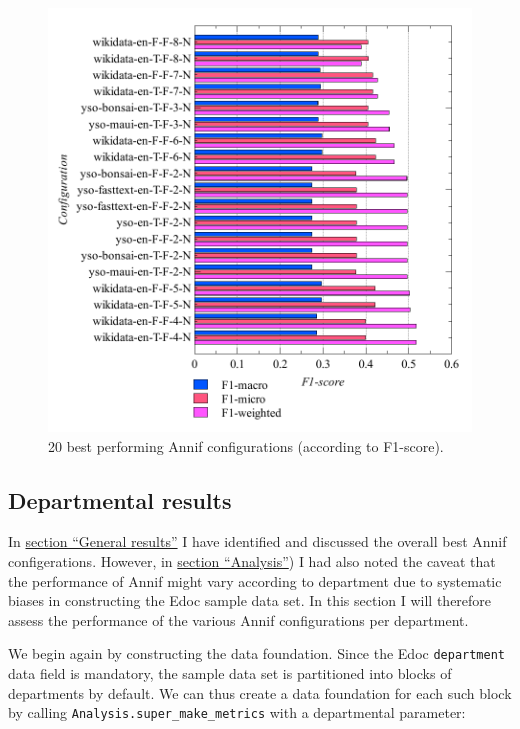 \begin{figure}
\centering
\includegraphics{images/metrics_f1_top20.pdf}
\caption{20 best performing Annif configurations (according to
F1-score).}
\end{figure}

\hypertarget{departmental-results}{%
\subsection{Departmental results}\label{departmental-results}}

In \protect\hyperlink{general-results}{section ``General results''} I
have identified and discussed the overall best Annif configerations.
However, in \protect\hyperlink{analysis}{section ``Analysis''}) I had
also noted the caveat that the performance of Annif might vary according
to department due to systematic biases in constructing the Edoc sample
data set. In this section I will therefore assess the performance of the
various Annif configurations per department.

We begin again by constructing the data foundation. Since the Edoc
\texttt{department} data field is mandatory, the sample data set is
partitioned into blocks of departments by default. We can thus create a
data foundation for each such block by calling
\texttt{Analysis.super\_make\_metrics} with a departmental parameter:

